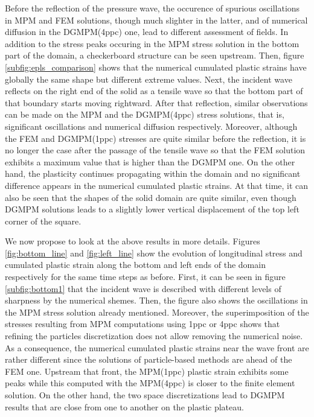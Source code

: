 Before the reflection of the pressure wave, the occurence of spurious oscillations in MPM and FEM solutions, though much slighter in the latter, and of numerical diffusion in the DGMPM(4ppc) one, lead to different assessment of fields.
In addition to the stress peaks occuring in the MPM stress solution in the bottom part of the domain, a checkerboard structure can be seen upstream.
Then, figure \ref{subfig:epls_comparison} shows that the numerical cumulated plastic strains have globally the same shape but different extreme values.
%
Next, the incident wave reflects on the right end of the solid as a tensile wave so that the bottom part of that boundary starts moving rightward.
After that reflection, similar observations can be made on the MPM and the DGMPM(4ppc) stress solutions, that is, significant oscillations and numerical diffusion respectively.
Moreover, although the FEM and DGMPM(1ppc) stresses are quite similar before the reflection, it is no longer the case after the passage of the tensile wave so that the FEM solution exhibits a maximum value that is higher than the DGMPM one.
On the other hand, the plasticity continues propagating within the domain and no significant difference appears in the numerical cumulated plastic strains.
At that time, it can also be seen that the shapes of the solid domain are quite similar, even though DGMPM solutions leads to a slightly lower vertical displacement of the top left corner of the square.

We now propose to look at the above results in more details.
Figures \ref{fig:bottom_line} and \ref{fig:left_line} show the evolution of longitudinal stress and cumulated plastic strain along the bottom and left ends of the domain respectively for the same time steps as before.
First, it can be seen in figure \ref{subfig:bottom1} that the incident wave is described with different levels of sharpness by the numerical shemes.
Then, the figure also shows the oscillations in the MPM stress solution already mentioned.
Moreover, the superimposition of the stresses resulting from MPM computations using 1ppc or 4ppc shows that refining the particles discretization does not allow removing the numerical noise.
As a consequence, the numerical cumulated plastic strains near the wave front are rather different since the solutions of particle-based methods are ahead of the FEM one.
Upstream that front, the MPM(1ppc) plastic strain exhibits some peaks while this computed with the MPM(4ppc) is closer to the finite element solution.
On the other hand, the two space discretizations lead to DGMPM results that are close from one to another on the plastic plateau.

